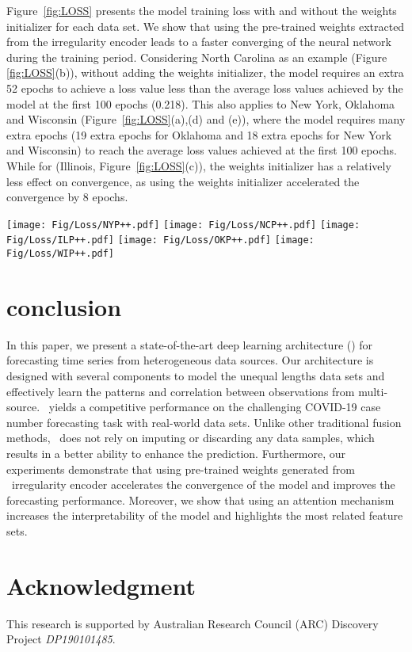 \documentclass[conference]{IEEEtran}
\begin{document}
Figure~\ref{fig:LOSS} presents the model training loss with and without the weights initializer for each data set. We show that using the pre-trained weights extracted from the irregularity encoder leads to a faster converging of the neural network during the training period. Considering North Carolina as an example (Figure \ref{fig:LOSS}(b)), without adding the weights initializer, the model requires an extra 52 epochs to achieve a loss value less than the average loss values achieved by the model at the first 100 epochs (0.218). This also applies to New York, Oklahoma and Wisconsin (Figure~\ref{fig:LOSS}(a),(d) and (e)), where the model requires many extra epochs (19 extra epochs for Oklahoma and 18 extra epochs for New York and Wisconsin) to reach the average loss values achieved at the first 100 epochs. While for (Illinois, Figure~\ref{fig:LOSS}(c)), the weights initializer has a relatively less effect on convergence, as using the weights initializer accelerated the convergence by 8 epochs.

\begin{figure*}[!t]
\centering
{}
{\texttt{[image: Fig/Loss/NYP++.pdf]}}
{\texttt{[image: Fig/Loss/NCP++.pdf]}}
{\texttt{[image: Fig/Loss/ILP++.pdf]}}
{\texttt{[image: Fig/Loss/OKP++.pdf]}}
{\texttt{[image: Fig/Loss/WIP++.pdf]}}
\caption{Loss convergence during training for \name\ with and without weights initializer. Using the full modules of \name\  accelerates the convergence for all cases. }\label{fig:LOSS}
\end{figure*}

\section{conclusion}
In this paper, we present a state-of-the-art deep learning architecture (\name) for forecasting time series from heterogeneous data sources. Our architecture is designed with several components to model the unequal lengths data sets and effectively learn the patterns and correlation between observations from multi-source. \name\ yields a competitive performance on the challenging COVID-19 case number forecasting task with real-world data sets. Unlike other traditional fusion methods, \name\ does not rely on imputing or discarding any data samples, which results in a better ability to enhance the prediction.
Furthermore, our experiments demonstrate that using pre-trained weights generated from \name\ irregularity encoder accelerates the convergence of the model and improves the forecasting performance. Moreover, we show that using an attention mechanism increases the interpretability of the model and highlights the most related feature sets.


\section*{Acknowledgment}
 This research is supported by Australian Research Council (ARC) Discovery Project \textit{DP190101485}.
 


\end{document}
